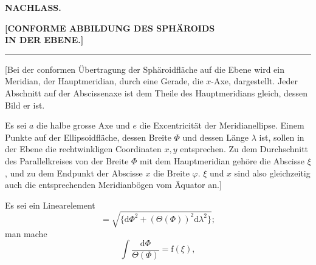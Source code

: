 \par\clearpage\null\thispagestyle{empty}\clearpage
\begin{center}
{\Large\textbf{NACHLASS.}}\par\medskip
{\large\textbf{[CONFORME ABBILDUNG DES SPHÄROIDS\\IN DER EBENE.]}}\par\smallskip
\rule{18mm}{.4pt}\par\medskip
[1.]\par{}
\end{center}
[Bei der conformen Übertragung der Sphäroidfläche auf die Ebene wird ein Meridian, der Hauptmeridian, durch eine Gerade, die \(x\)-Axe, dargestellt. Jeder Abschnitt auf der Abscissenaxe ist dem Theile des Hauptmeridians gleich, dessen Bild er ist.

Es sei \(a\) die halbe grosse Axe und \(e\) die Excentricität der Meridianellipse. Einem Punkte auf der Ellipsoidfläche, dessen Breite \(\Phi\) und dessen Länge \(\lambda\) ist, sollen in der Ebene die rechtwinkligen Coordinaten \(x,y\) entsprechen. Zu dem Durchschnitt des Parallelkreises von der Breite \(\Phi\) mit dem Hauptmeridian gehöre die Abscisse \(\xi\), und zu dem Endpunkt der Abscisse \(x\) die Breite \(\varphi\). \(\xi\) und \(x\) sind also gleichzeitig auch die entsprechenden Meridianbögen vom Äquator an.]

Es sei ein Linearelement
\[=\sqrt{\{\mathrm d\Phi^2+(\Theta(\Phi))^2\mathrm d\lambda^2\}};\]
\noindent man mache
\[\int\frac{\mathrm d\Phi}{\Theta(\Phi)}=\mathrm f(\xi),\]

